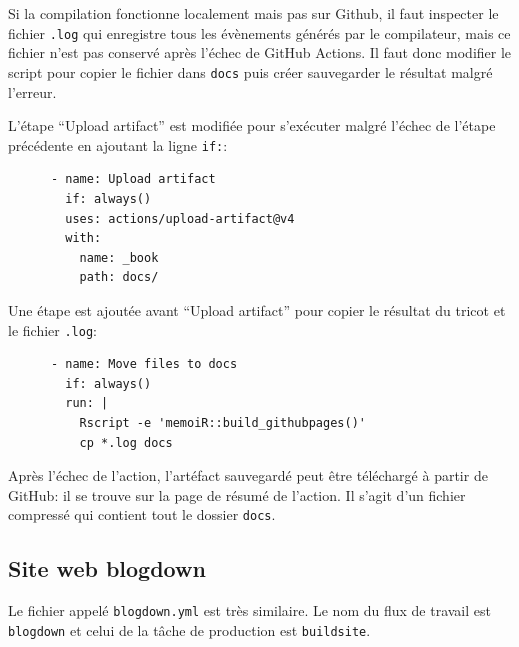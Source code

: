 \documentclass[
  12pt,
  french,
  a4paper,
  extrafontsizes,onecolumn,openright
  ]{memoir}
\begin{document}
\normalsize

Si la compilation fonctionne localement mais pas sur Github, il faut inspecter le fichier \texttt{.log} qui enregistre tous les évènements générés par le compilateur, mais ce fichier n'est pas conservé après l'échec de GitHub Actions.
Il faut donc modifier le script pour copier le fichier dans \texttt{docs} puis créer sauvegarder le résultat malgré l'erreur.

L'étape \enquote{Upload artifact} est modifiée pour s'exécuter malgré l'échec de l'étape précédente en ajoutant la ligne \texttt{if:}:

\begin{verbatim}
      - name: Upload artifact
        if: always()
        uses: actions/upload-artifact@v4
        with:
          name: _book
          path: docs/
\end{verbatim}

Une étape est ajoutée avant \enquote{Upload artifact} pour copier le résultat du tricot et le fichier \texttt{.log}:

\begin{verbatim}
      - name: Move files to docs
        if: always()
        run: |
          Rscript -e 'memoiR::build_githubpages()'
          cp *.log docs
\end{verbatim}

Après l'échec de l'action, l'artéfact sauvegardé peut être téléchargé à partir de GitHub: il se trouve sur la page de résumé de l'action.
Il s'agit d'un fichier compressé qui contient tout le dossier \texttt{docs}.

\subsection{Site web blogdown}\label{sec:blogdown-ci}

Le fichier appelé \texttt{blogdown.yml} est très similaire.
Le nom du flux de travail est \texttt{blogdown} et celui de la tâche de production est \texttt{buildsite}.
\end{document}
